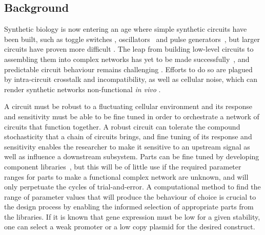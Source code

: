 \subsection{Background}
Synthetic biology is now entering an age where simple synthetic circuits have been built, such as toggle switches \autocite{Gardner:2000vha, Kramer:2004kq, Isaacs:2003ht, Ham:2008hh, Deans:2007cya, Friedland:2009ce}, oscillators~\autocite{Stricker:2008jqa, Fung:2005jd, Tigges:2009jx} and pulse generators~\autocite{Basu:2004gn}, but larger circuits have proven more difficult \autocite{XXX}. The leap from building low-level circuits to assembling them into complex networks has yet to be made successfully~\autocite{Lu:2009ez}, and predictable circuit behaviour remains challenging \autocite{XXX}. Efforts to do so are plagued by intra-circuit crosstalk and incompatibility, as well as cellular noise, which can render synthetic networks non-functional \textit{in vivo} \autocite{XXX}. 
\par
A circuit must be robust to a fluctuating cellular environment and its response and sensitivity must be able to be fine tuned in order to orchestrate a network of circuits that function together. A robust circuit can tolerate the compound stochasticity that a chain of circuits brings, and fine tuning of its response and sensitivity enables the researcher to make it sensitive to an upstream signal as well as influence a downstream subsystem. Parts can be fine tuned by developing component libraries~\autocite{Lu:2009ez,}, but this will be of little use if the required parameter ranges for parts to make a functional complex network are unknown, and will only perpetuate the cycles of trial-and-error. A computational method to find the range of parameter values that will produce the behaviour of choice is crucial to the design process by enabling the informed selection of appropriate parts from the libraries. If it is known that gene expression must be low for a given stability, one can select a weak promoter or a low copy plasmid for the desired construct. 
\par
